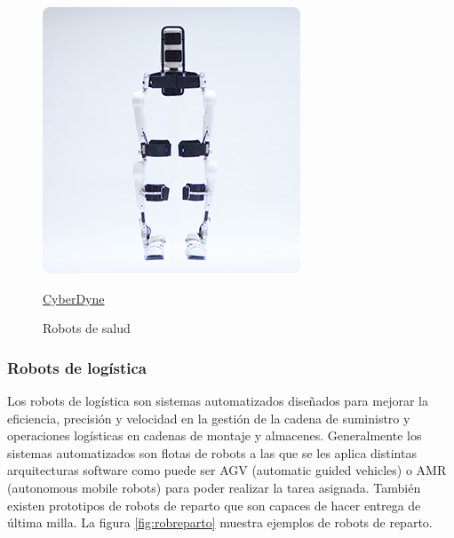 \begin{figure}[ht!]
\begin{minipage}{0.25\linewidth}
    	\includegraphics[width=\linewidth]{figs/cyberdyne.jpg}
    	\caption*{\centering\href{https://www.cyberdyne.com/}{CyberDyne}}
    \end{minipage}
	\caption{Robots de salud}
	\label{fig:robsalud}
\end{figure}

\subsubsection{Robots de logística}

Los robots de logística son sistemas automatizados diseñados para mejorar la eficiencia, precisión y velocidad en la gestión de la cadena de suministro y operaciones logísticas en cadenas de montaje y almacenes. Generalmente los sistemas automatizados son flotas de robots a las que se les aplica distintas arquitecturas software como puede ser AGV (automatic guided vehicles) o AMR (autonomous mobile robots) para poder realizar la tarea asignada. También existen prototipos de robots de reparto que son capaces de hacer entrega de última milla. La figura \ref{fig:robreparto}  muestra ejemplos de robots de reparto.  


